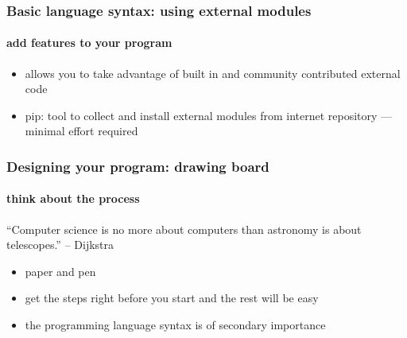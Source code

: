 \documentclass{beamer}
\begin{document}


    \begin{frame}
	    \frametitle{Basic language syntax: using external modules}
	    \framesubtitle{add features to your program}
	    \begin{itemize}
		    \item allows you to take advantage of built in and community contributed external code
		    \item pip: tool to collect and install external modules from internet repository --- minimal effort required
	    \end{itemize}
	    \lstL
	    \lstM
    \end{frame}

    \begin{frame}
	    \frametitle{Designing your program: drawing board}
	    \framesubtitle{think about the process}
	    {
		    \scriptsize
		    ``Computer science is no more about computers than astronomy is about telescopes.''
		    \newline
		    -- Dijkstra
		    }
	    \begin{itemize}
		    \item paper and pen
		    \item get the steps right before you start and the rest will be easy
		    \item the programming language syntax is of secondary importance
	    \end{itemize}
    \end{frame}
\end{document}
